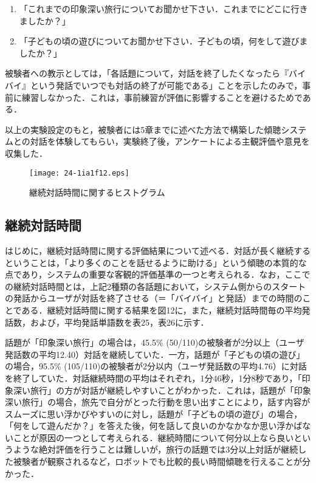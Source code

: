 \documentclass[japanese]{jnlp_1.4}
\begin{document}
\begin{enumerate}
\item 「これまでの印象深い旅行についてお聞かせ下さい．これまでにどこに行きましたか？」

\item 「子どもの頃の遊びについてお聞かせ下さい．子どもの頃，何をして遊びましたか？」
\end{enumerate}

被験者への教示としては，「各話題について，対話を終了したくなったら『バイバイ』という発話でいつでも対話の終了が可能である」ことを示したのみで，事前に練習しなかった．これは，事前練習が評価に影響することを避けるためである．

以上の実験設定のもと，被験者には5章までに述べた方法で構築した傾聴システムとの対話を体験してもらい，実験終了後，アンケートによる主観評価や意見を収集した．


\begin{figure}[b]
\begin{center}
\texttt{[image: 24-1ia1f12.eps]}
\end{center}
\caption{継続対話時間に関するヒストグラム}
\label{fig:12}
\end{figure}

\subsection{継続対話時間}

はじめに，継続対話時間に関する評価結果について述べる．対話が長く継続するということは，「より多くのことを話せるように助ける」という傾聴の本質的な点であり，システムの重要な客観的評価基準の一つと考えられる．なお，ここでの継続対話時間とは，上記2種類の各話題において，システム側からのスタートの発話からユーザが対話を終了させる（＝「バイバイ」と発話）までの時間のことである．継続対話時間に関する結果を図12に，また，継続対話時間毎の平均発話数，および，平均発話単語数を表25，表26に示す．

話題が「印象深い旅行」の場合は，45.5\% (50/110)の被験者が2分以上（ユーザ発話数の平均12.40）対話を継続していた．一方，話題が「子どもの頃の遊び」の場合，95.5\% (105/110)の被験者が2分以内（ユーザ発話数の平均4.76）に対話を終了していた．対話継続時間の平均はそれぞれ，1分46秒，1分8秒であり，「印象深い旅行」の方が対話が継続しやすいことがわかった．これは，話題が「印象深い旅行」の場合，旅先で自分がとった行動を思い出すことにより，話す内容がスムーズに思い浮かびやすいのに対し，話題が「子どもの頃の遊び」の場合，「何をして遊んだか？」を答えた後，何を話して良いのかなかなか思い浮かばないことが原因の一つとして考えられる．継続時間について何分以上なら良いというような絶対評価を行うことは難しいが，旅行の話題では3分以上対話が継続した被験者が観察されるなど，ロボットでも比較的長い時間傾聴を行えることが分かった．
\end{document}
